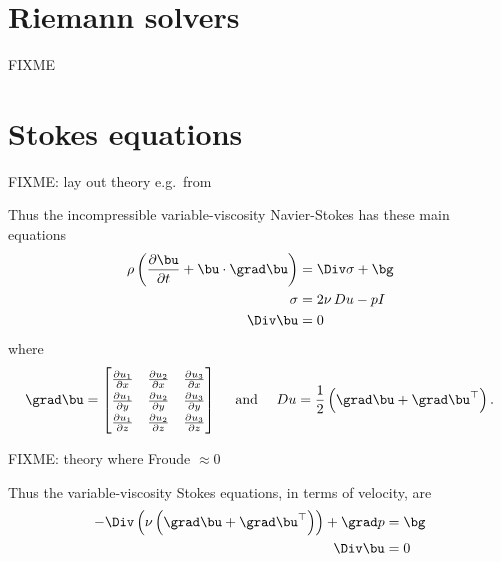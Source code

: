 
\section{Riemann solvers}

FIXME

\section{Stokes equations}

FIXME: lay out theory e.g.~from \citep{Acheson1990,Elmanetal2005,Ockendonetal2003}

Thus the incompressible variable-viscosity Navier-Stokes has these main equations
\begin{align}
\rho \left(\frac{\partial \bu}{\partial t} + \bu \cdot \grad \bu\right) &= \Div \sigma + \bg \label{stokesgeneralconserve} \\
\sigma &= 2 \nu\, Du - p I \label{stokesgenerallaw} \\
\Div \bu &= 0 \label{stokesgeneralincomp}
\end{align}
where
  $$\grad \bu = \renewcommand{\arraystretch}{1.3}\begin{bmatrix}
    \frac{\partial u_1}{\partial x} & \frac{\partial u_2}{\partial x} & \frac{\partial u_3}{\partial x} \\
    \frac{\partial u_1}{\partial y} & \frac{\partial u_2}{\partial y} & \frac{\partial u_3}{\partial y} \\
    \frac{\partial u_1}{\partial z} & \frac{\partial u_2}{\partial z} & \frac{\partial u_3}{\partial z}
    \end{bmatrix}
    \quad \text{ and } \quad
    D u = \frac{1}{2} \left(\grad \bu + \grad \bu^{\top}\right).$$

FIXME: theory where Froude $\approx 0$

Thus the variable-viscosity Stokes equations, in terms of velocity, are
\begin{align*}
- \Div \left(\nu \left(\grad \bu + \grad \bu^{\top}\right)\right) + \grad p &= \bg \\
\Div \bu &= 0
\end{align*}


